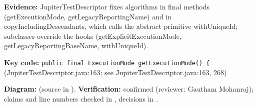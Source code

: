 \documentclass[11pt,a4paper]{article}
\begin{document}
\textbf{Evidence:} JupiterTestDescriptor fixes algorithms in final methods (getExecutionMode, getLegacyReportingName) and in copyIncludingDescendants, which calls the abstract primitive withUniqueId; subclasses override the hooks (getExplicitExecutionMode, getLegacyReportingBaseName, withUniqueId).\par
\textbf{Key code:} \texttt{public final Execution\allowbreak{}Mode get\allowbreak{}Execution\allowbreak{}Mode() \{} (JupiterTestDescriptor.java:163; see JupiterTestDescriptor.java:163, 268)\par
\textbf{Diagram:}  (source in ). \textbf{Verification:} confirmed (reviewer: Gautham Mohanraj); claims and line numbers checked in , decisions in .\par
\end{document}
